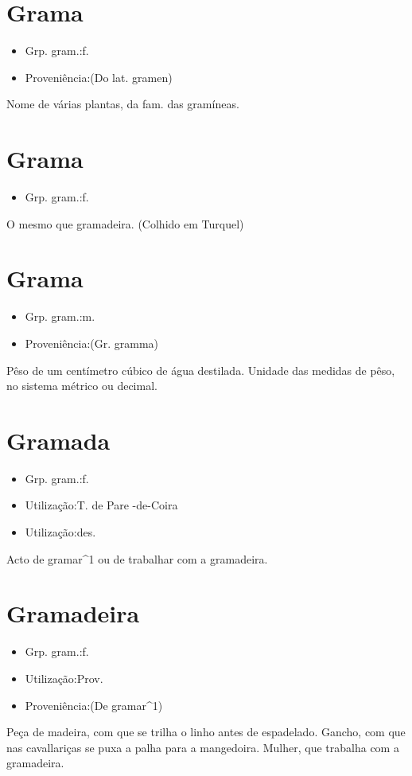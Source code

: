 \section{Grama}
\begin{itemize}
\item {Grp. gram.:f.}
\end{itemize}
\begin{itemize}
\item {Proveniência:(Do lat. \textunderscore gramen\textunderscore )}
\end{itemize}
Nome de várias plantas, da fam. das gramíneas.
\section{Grama}
\begin{itemize}
\item {Grp. gram.:f.}
\end{itemize}
O mesmo que \textunderscore gramadeira\textunderscore . (Colhido em Turquel)
\section{Grama}
\begin{itemize}
\item {Grp. gram.:m.}
\end{itemize}
\begin{itemize}
\item {Proveniência:(Gr. \textunderscore gramma\textunderscore )}
\end{itemize}
Pêso de um centímetro cúbico de água destilada.
Unidade das medidas de pêso, no sistema métrico ou decimal.
\section{Gramada}
\begin{itemize}
\item {Grp. gram.:f.}
\end{itemize}
\begin{itemize}
\item {Utilização:T. de Pare -de-Coira}
\end{itemize}
\begin{itemize}
\item {Utilização:des.}
\end{itemize}
Acto de gramar^1 ou de trabalhar com a gramadeira.
\section{Gramadeira}
\begin{itemize}
\item {Grp. gram.:f.}
\end{itemize}
\begin{itemize}
\item {Utilização:Prov.}
\end{itemize}
\begin{itemize}
\item {Proveniência:(De \textunderscore gramar\textunderscore ^1)}
\end{itemize}
Peça de madeira, com que se trilha o linho antes de espadelado.
Gancho, com que nas cavallariças se puxa a palha para a mangedoira.
Mulher, que trabalha com a gramadeira.
